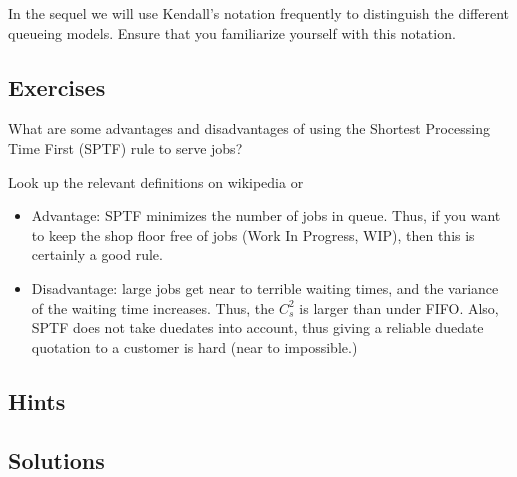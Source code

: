 In the sequel we will use Kendall's notation frequently to distinguish
the different queueing models. Ensure that you familiarize yourself
with this notation.


\subsection*{Exercises}
\begin{question}
  What are some advantages and disadvantages of using the Shortest
  Processing Time First (SPTF) rule to serve jobs? 
  \begin{hint}
Look up the relevant
  definitions on wikipedia or
  \citet{hall91:_queuein_method_servic_manuf}
  \end{hint}

  \begin{solution}
  \begin{itemize}
  \item Advantage: SPTF minimizes the number of jobs in queue. Thus,
    if you want to keep the shop floor free of jobs (Work In Progress,
    WIP), then this is certainly a good rule. 
  \item Disadvantage: large jobs get near to terrible waiting times,
    and the variance of the waiting time increases. Thus, the $C_s^2$
    is larger than under FIFO. Also, SPTF does not take duedates into
    account, thus giving a reliable duedate quotation to a customer is
    hard (near to impossible.)
  \end{itemize}
  \end{solution}
\end{question}


\subsection*{Hints}

\subsection*{Solutions}


